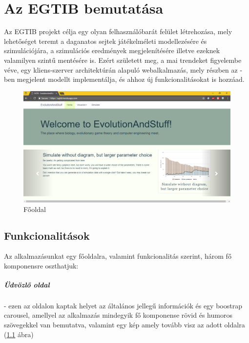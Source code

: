 \newcommand{\projectName}{Az EGTIB}

\chapter{\projectName{} bemutatása}

\projectName{} projekt célja egy olyan felhasználóbarát felület létrehozása, mely lehetőséget teremt a daganatos sejtek játékelméleti modellezésére és szimulációjára, a szimulációs eredmények megjelenítésére illetve ezeknek valamilyen szintű mentésére is. Ezért született meg, a mai trendeket figyelembe véve, egy kliens-szerver architektúrán alapuló webalkalmazás, mely részben az \cite{archetti2016cooperation}-ben megjelent modellt implementálja, és ahhoz új funkcionalitásokat is hozzáad.

\begin{figure}[ht!]
	\centering
	\includegraphics[width=0.98\linewidth]{images/welcomePage}
	\vspace*{1mm}
	\caption{Főoldal}
	\label{fig:welcomePage}
\end{figure}

\section{Funkcionalitások}

Az alkalmazásunkat egy főoldalra, valamint funkcionalitás szerint, három fő komponensre oszthatjuk:

\paragraph{Üdvözlő oldal}- ezen az oldalon kaptak helyet az általános jellegű információk és egy boostrap carousel, amellyel az alkalmazás mindegyik fő komponense rövid és humoros szövegekkel van bemutatva, valamint egy kép amely tovább visz az adott oldalra (\ref{fig:welcomePage} ábra)

